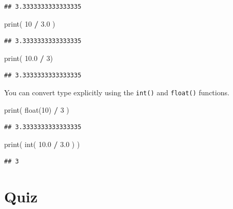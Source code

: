 \documentclass[]{book}
\newenvironment{Shaded}{\begin{snugshade}}{\end{snugshade}}
\newcommand{\BuiltInTok}[1]{#1}
\newcommand{\DecValTok}[1]{\textcolor[rgb]{0.00,0.00,0.81}{#1}}
\newcommand{\FloatTok}[1]{\textcolor[rgb]{0.00,0.00,0.81}{#1}}
\newcommand{\NormalTok}[1]{#1}
\newcommand{\OperatorTok}[1]{\textcolor[rgb]{0.81,0.36,0.00}{\textbf{#1}}}
\theoremstyle{definition}
\theoremstyle{definition}
\theoremstyle{definition}
\theoremstyle{remark}
\begin{document}
\begin{verbatim}
## 3.3333333333333335
\end{verbatim}

\begin{Shaded}
\begin{Highlighting}[]
\BuiltInTok{print}\NormalTok{( }\DecValTok{10} \OperatorTok{/} \FloatTok{3.0}\NormalTok{ )}
\end{Highlighting}
\end{Shaded}

\begin{verbatim}
## 3.3333333333333335
\end{verbatim}

\begin{Shaded}
\begin{Highlighting}[]
\BuiltInTok{print}\NormalTok{( }\FloatTok{10.0} \OperatorTok{/} \DecValTok{3}\NormalTok{)}
\end{Highlighting}
\end{Shaded}

\begin{verbatim}
## 3.3333333333333335
\end{verbatim}

You can convert type explicitly using the \texttt{int()} and
\texttt{float()} functions.

\begin{Shaded}
\begin{Highlighting}[]
\BuiltInTok{print}\NormalTok{( }\BuiltInTok{float}\NormalTok{(}\DecValTok{10}\NormalTok{) }\OperatorTok{/} \DecValTok{3}\NormalTok{ )}
\end{Highlighting}
\end{Shaded}

\begin{verbatim}
## 3.3333333333333335
\end{verbatim}

\begin{Shaded}
\begin{Highlighting}[]
\BuiltInTok{print}\NormalTok{( }\BuiltInTok{int}\NormalTok{( }\FloatTok{10.0} \OperatorTok{/} \FloatTok{3.0}\NormalTok{ ) )}
\end{Highlighting}
\end{Shaded}

\begin{verbatim}
## 3
\end{verbatim}

\hypertarget{quiz}{%
\section{Quiz}\label{quiz}}
\end{document}
